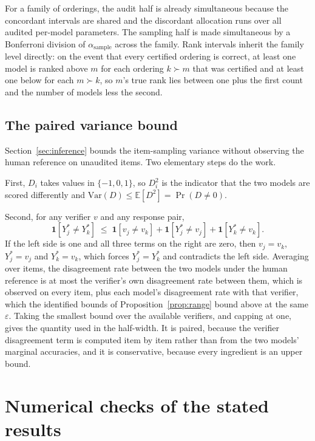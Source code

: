 For a family of orderings, the audit half is already simultaneous because the concordant
intervals are shared and the discordant allocation runs over all audited per-model parameters.
The sampling half is made simultaneous by a Bonferroni division of $\alpha_{\mathrm{sample}}$
across the family. Rank intervals inherit the family level directly: on the event that every
certified ordering is correct, at least one model is ranked above $m$ for each ordering
$k \succ m$ that was certified and at least one below for each $m \succ k$, so $m$'s true rank
lies between one plus the first count and the number of models less the second.

\subsection{The paired variance bound}
\label{app:paired}

Section~\ref{sec:inference} bounds the item-sampling variance without observing the human
reference on unaudited items. Two elementary steps do the work.

First, $D_i$ takes values in $\{-1,0,1\}$, so $D_i^2$ is the indicator that the two models are
scored differently and $\mathrm{Var}(D) \le \mathbb{E}[D^2] = \Pr(D \ne 0)$.

Second, for any verifier $v$ and any response pair,
\[
\mathbf{1}[Y^\ast_j \ne Y^\ast_k] \;\le\; \mathbf{1}[v_j \ne v_k] + \mathbf{1}[Y^\ast_j \ne v_j] + \mathbf{1}[Y^\ast_k \ne v_k] .
\]
If the left side is one and all three terms on the right are zero, then $v_j = v_k$,
$Y^\ast_j = v_j$ and $Y^\ast_k = v_k$, which forces $Y^\ast_j = Y^\ast_k$ and contradicts the
left side. Averaging over items, the disagreement rate between the two models under the human
reference is at most the verifier's own disagreement rate between them, which is observed on
every item, plus each model's disagreement rate with that verifier, which the identified
bounds of Proposition~\ref{prop:range} bound above at the same $\varepsilon$. Taking the
smallest bound over the available verifiers, and capping at one, gives the quantity used in
the half-width. It is paired, because the verifier disagreement term is computed item by item
rather than from the two models' marginal accuracies, and it is conservative, because every
ingredient is an upper bound.

\section{Numerical checks of the stated results}
\label{app:tests}

